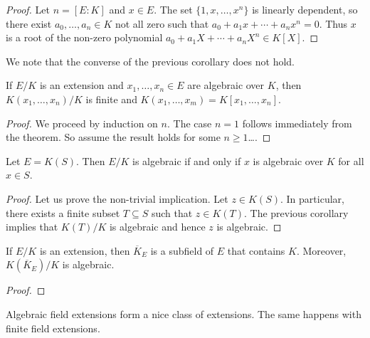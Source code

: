 \begin{proof}
	Let $n=[E:K]$ and $x\in E$. The set $\{1,x,\dots,x^n\}$ is linearly dependent, 
	so there exist $a_0,\dots,a_n\in K$ not all zero such that
	$a_0+a_1x+\cdots+a_nx^n=0$. Thus $x$ is a root of the non-zero
	polynomial $a_0+a_1X+\cdots+a_nX^n\in K[X]$. 
\end{proof}

We note that the converse of the previous corollary does not hold. 

\begin{corollary}
	If $E/K$ is an extension and $x_1,\dots,x_n\in E$ 
	are algebraic over $K$, then 
	$K(x_1,\dots,x_n)/K$ is finite and
	$K(x_1,\dots,x_m)=K[x_1,\dots,x_n]$. 
\end{corollary}

\begin{proof}
	We proceed by induction on $n$. The case $n=1$ follows immediately from 
	the theorem. So assume the result holds for some $n\geq1$\dots.
\end{proof}

\begin{corollary}
	Let $E=K(S)$. Then $E/K$ is algebraic if and only if
	$x$ is algebraic over $K$ for all $x\in S$. 
\end{corollary}

\begin{proof}
	Let us prove the non-trivial implication. Let $z\in K(S)$. In particular, 
	there exists a finite subset $T\subseteq S$ such that 
	$z\in K(T)$. The previous corollary implies that $K(T)/K$ is algebraic and
	hence $z$ is algebraic. 
\end{proof}

\begin{corollary}
	If $E/K$ is  an extension, then $\overline{K}_E$ 
	is a subfield of $E$ that contains $K$. Moreover, 
	$K(\overline{K}_E)/K$ is algebraic. 
\end{corollary}	

\begin{proof}
\end{proof}

\begin{corollary}
\end{corollary}


%
%
%
Algebraic field extensions form a nice class of extensions. The same happens
with finite field extensions. 

